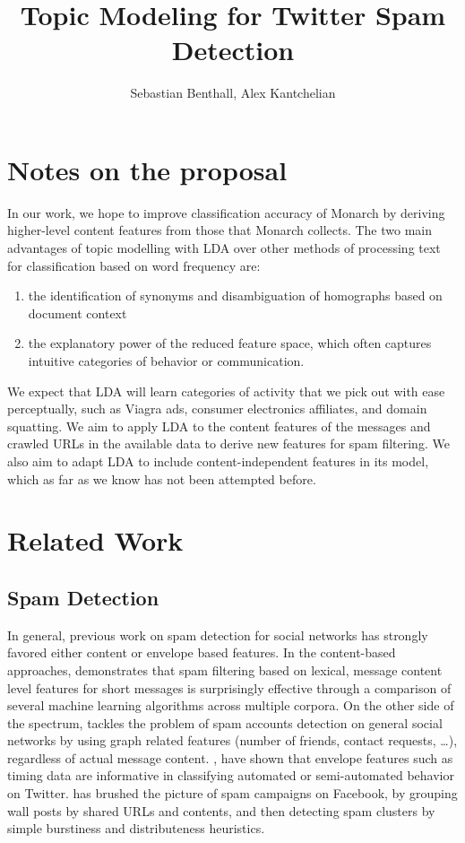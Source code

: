 \documentclass[journal]{IEEEtran}
\begin{document}
\title{Topic Modeling for Twitter Spam Detection}
\author{Sebastian Benthall, Alex Kantchelian}
\maketitle

\section{Notes on the proposal}
In our work, we hope to improve classification accuracy of Monarch by deriving higher-level content features from those that Monarch collects. The two main advantages of topic modelling with LDA over other methods of processing text for classification based on word frequency are:
\begin{enumerate}
\item the identification of synonyms and disambiguation of homographs based on document context
\item the explanatory power of the reduced feature space, which often captures intuitive categories of behavior or communication. 
\end{enumerate}
We expect that LDA will learn categories of activity that we pick out with ease perceptually, such as Viagra ads, consumer electronics affiliates, and domain squatting.
We aim to apply LDA to the content features of the messages and crawled URLs in the available data to derive new features for spam filtering. We also aim to adapt LDA to include content-independent features in its model, which as far as we know has not been attempted before.

\section{Related Work}
\subsection{Spam Detection}
In general, previous work on spam detection for social networks has strongly favored either content or envelope based features. In the content-based approaches, \cite{Cormack2007} demonstrates that spam filtering based on lexical, message content level features for short messages is surprisingly effective through a comparison of several machine learning algorithms across multiple corpora. On the other side of the spectrum, \cite{Stringhini2010} tackles the problem of spam accounts detection on general social networks by using graph related features (number of friends, contact requests, \dots), regardless of actual message content. \cite{Zhang2011}, \cite{Ghosh2011} have shown that envelope features such as timing data are informative in classifying automated or semi-automated behavior on Twitter. \cite{Gao2010} has brushed the picture of spam campaigns on Facebook, by grouping wall posts by shared URLs and contents, and then detecting spam clusters by simple burstiness and distributeness heuristics.
\end{document}
